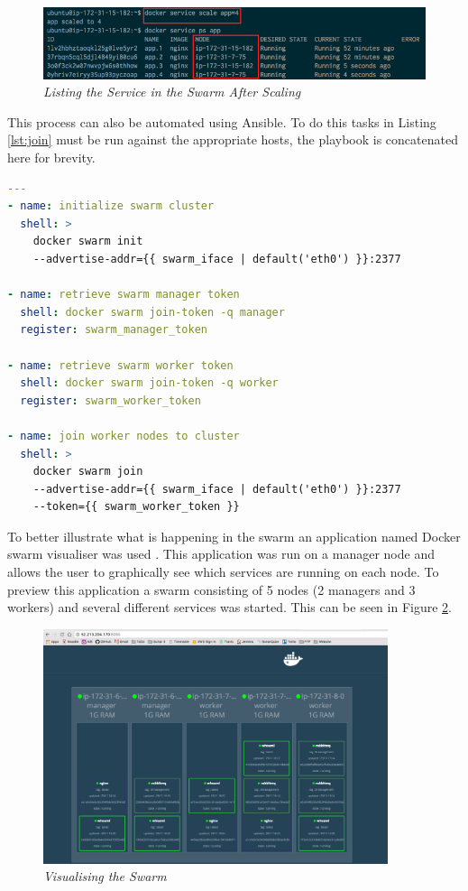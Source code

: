 \documentclass{article}
\begin{document}
\begin{figure}[!h]
\centering
\includegraphics*[width=\textwidth]{components/images/swarm_after_scale}
\caption{\em Listing the Service in the Swarm After Scaling}
\label{fig:swarm_after_scale}
\end{figure}

This process can also be automated using Ansible. To do this tasks in Listing \ref{lst:join} must be run against the appropriate hosts, the playbook is concatenated here for brevity.

\newpage
\begin{lstlisting}[float,floatplacement=!h,language=yaml,caption={create-and-join-swarm.yml},label={lst:join},basicstyle=\scriptsize]
  ---
- name: initialize swarm cluster
  shell: >
    docker swarm init
    --advertise-addr={{ swarm_iface | default('eth0') }}:2377

- name: retrieve swarm manager token
  shell: docker swarm join-token -q manager
  register: swarm_manager_token

- name: retrieve swarm worker token
  shell: docker swarm join-token -q worker
  register: swarm_worker_token
  
- name: join worker nodes to cluster
  shell: >
    docker swarm join
    --advertise-addr={{ swarm_iface | default('eth0') }}:2377
    --token={{ swarm_worker_token }}
\end{lstlisting}

To better illustrate what is happening in the swarm an application named Docker swarm visualiser was used \citep{Marks2016}. This application was run on a manager node and allows the user to graphically see which services are running on each node. To preview this application a swarm consisting of 5 nodes (2 managers and 3 workers) and several different services was started. This can be seen in Figure \ref{fig:visualiser}.

\begin{figure}[!h]
\centering
\includegraphics*[width=0.9\textwidth]{components/images/visualiser}
\caption{\em Visualising the Swarm}
\label{fig:visualiser}
\end{figure}
\end{document}

